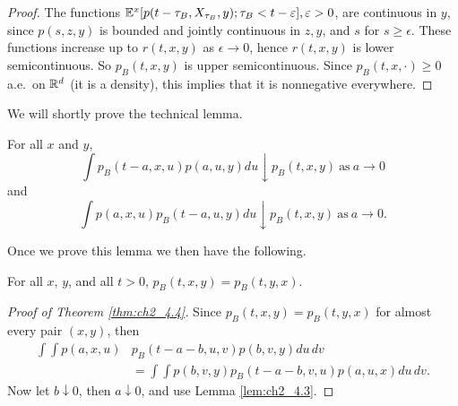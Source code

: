 \begin{proof}
The functions $\mathbb{E}^x[p(t-\tau_B,X_{\tau_B},y);\tau_B < t-\varepsilon], \varepsilon > 0$, are continuous in $y$, since $p(s,z,y)$ is bounded and jointly continuous in $z,y$, and $s$ for $s \geq \epsilon$. These functions increase up to $r(t,x,y)$ as $\epsilon \to 0$, hence $r(t,x,y)$ is lower semicontinuous. So $p_B(t,x,y)$ is upper semicontinuous. Since $p_B(t,x,\cdot) \geq 0$ a.e.\ on $\mathbb{R}^d$ (it is a density), this implies that it is nonnegative everywhere.
\end{proof}

We will shortly prove the technical lemma.

\begin{lemma}\label{lem:ch2_4.3}
For all $x$ and $y$,
\begin{equation}\label{eq:ch2_4.6}
    \int p_B(t-a,x,u)p(a,u,y)du \downarrow p_B(t,x,y)~\text{as}~a \to 0
\end{equation}
and
\begin{equation}\label{eq:ch2_4.7}
    \int p(a,x,u)p_B(t-a,u,y)du \downarrow p_B(t,x,y)~\text{as}~a \to 0.
\end{equation}
\end{lemma}

Once we prove this lemma we then have the following.

\begin{theorem}\label{thm:ch2_4.4}
For all $x$, $y$, and all $t > 0$, $p_B(t,x,y) = p_B(t,y,x)$.
\end{theorem}

\begin{proof}[Proof of Theorem \ref{thm:ch2_4.4}]
Since $p_B(t,x,y) = p_B(t,y,x)$ for almost every pair $(x,y)$, then
\begin{align*}
    \int\int p(a,x,u)&p_B(t-a-b,u,v)p(b,v,y)du\,dv \\
    &= \int\int p(b,v,y)p_B(t-a-b,v,u)p(a,u,x)du\,dv.
\end{align*}
Now let $b \downarrow 0$, then $a \downarrow 0$, and use Lemma \ref{lem:ch2_4.3}.
\end{proof}

